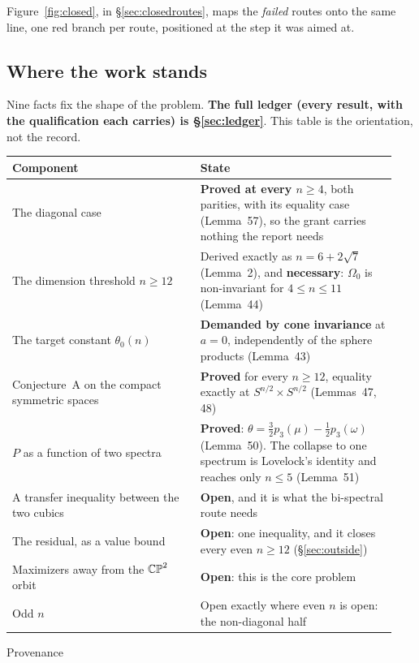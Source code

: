 



Figure~\ref{fig:closed}, in \S\ref{sec:closedroutes}, maps the \emph{failed} routes onto the same line, one red branch per route, positioned at the step it was aimed at.

\subsection{Where the work stands}

Nine facts fix the shape of the problem. \textbf{The full ledger (every result, with the qualification each carries) is \S\ref{sec:ledger}}. This table is the orientation, not the record.

\begin{center}
\begin{tabular}{@{}p{0.46\linewidth}p{0.48\linewidth}@{}}
\toprule
\textbf{Component} & \textbf{State} \\
\midrule
The diagonal case & \textbf{Proved at every $n\ge4$}, both parities, with its equality case (Lemma~57), so the grant carries nothing the report needs \\
The dimension threshold $n\ge12$ & Derived exactly as $n=6+2\sqrt7$ (Lemma~2), and \textbf{necessary}: $\Omega_0$ is non-invariant for $4\le n\le11$ (Lemma~44) \\
The target constant $\theta_0(n)$ & \textbf{Demanded by cone invariance} at $a=0$, independently of the sphere products (Lemma~43) \\
Conjecture~A on the compact symmetric spaces & \textbf{Proved} for every $n\ge12$, equality exactly at $S^{n/2}\times S^{n/2}$ (Lemmas~47, 48) \\
$P$ as a function of two spectra & \textbf{Proved}: $\theta=\tfrac32p_3(\mu)-\tfrac12p_3(\omega)$ (Lemma~50). The collapse to one spectrum is Lovelock's identity and reaches only $n\le5$ (Lemma~51) \\
A transfer inequality between the two cubics & \textbf{Open}, and it is what the bi-spectral route needs \\
The residual, as a value bound & \textbf{Open}: one inequality, and it closes every even $n\ge12$ (\S\ref{sec:outside}) \\
Maximizers away from the $\mathbb{CP}^2$ orbit & \textbf{Open}: this is the core problem \\
Odd $n$ & Open exactly where even $n$ is open: the non-diagonal half \\
\bottomrule
\end{tabular}
\end{center}{Provenance}

